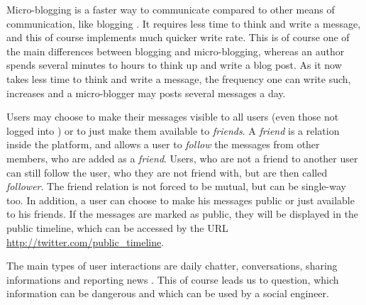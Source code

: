 Micro-blogging is a faster way to communicate compared to other means of
communication, like blogging \cite{java2007}. It requires less time to think
and write a message, and this of course implements much quicker \flqq{}write
rate\frqq{}. This is of course one of the main differences between blogging and
micro-blogging, whereas an author spends several minutes to hours to think up
and write a blog post. As it now takes less time to think and write a message,
the frequency one can write such, increases and a micro-blogger may posts
several messages a day.

Users may choose to make their messages visible to all users (even those not
logged into \Twitter{}) or to just make them available to \textit{friends}. A
\textit{friend} is a relation inside the \Twitter{} platform, and allows a user
to \textit{follow} the messages from other members, who are added as a
\textit{friend}. Users, who are not a friend to another user can still follow
the user, who they are not friend with, but are then called \textit{follower}.
The friend relation is not forced to be mutual, but can be single-way too. In
addition, a user can choose to make his messages public or just available to
his friends. If the messages are marked as public, they will be displayed in
the public timeline, which can be accessed by the URL
\url{http://twitter.com/public_timeline}.

The main types of user interactions are daily chatter, conversations, sharing
informations and reporting news \cite{java2007}. This of course leads us to
question, which information can be dangerous and which can be used by a social
engineer.

